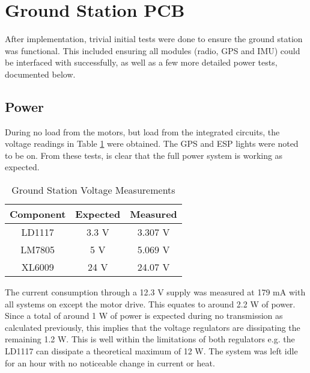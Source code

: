 \section{Ground Station PCB}

After implementation, trivial initial tests were done to ensure the ground station was functional. This included ensuring all modules (radio, GPS and IMU) could be interfaced with successfully, as well as a few more detailed power tests, documented below.

\subsection{Power}

During no load from the motors, but load from the integrated circuits, the voltage readings in Table \ref{tab:gs_pcb_voltage} were obtained. The GPS and ESP lights were noted to be on. From these tests, is clear that the full power system is working as expected.
\begin{table}[!htb]
  \centering
  \renewcommand{\arraystretch}{1.2}
  \begin{tabular}{ |c|c|c| }
  \hline
  \textbf{Component}        & \textbf{Expected}     & \textbf{Measured}  \\
  \hline
  LD1117                 &  3.3 V             & 3.307 V \\  \hline
  LM7805                 &  5 V               & 5.069 V \\  \hline
  XL6009                 &  24 V             & 24.07 V  \\ \hline
  \end{tabular}
  \caption{Ground Station Voltage Measurements}
  \label{tab:gs_pcb_voltage}
\end{table}

The current consumption through a 12.3 V supply was measured at 179 mA with all systems on except the motor drive. This equates to around 2.2 W of power. Since a total of around 1 W of power is expected during no transmission as calculated previously, this implies that the voltage regulators are dissipating the remaining 1.2 W. This is well within the limitations of both regulators e.g. the LD1117 can dissipate a theoretical maximum of 12 W. The system was left idle for an hour with no noticeable change in current or heat.


